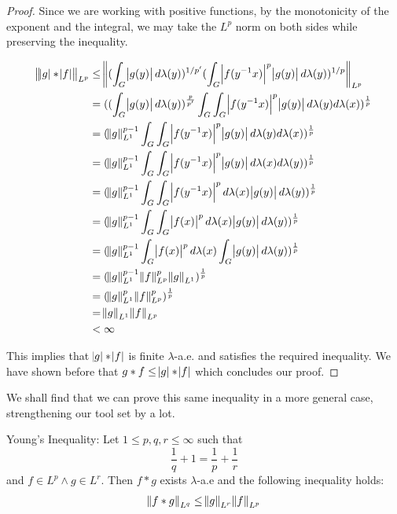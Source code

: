 \begin{proof}
Since we are working with positive functions, by the monotonicity of the exponent and the integral, we may take the $L^p$ norm on both sides while preserving the inequality.

\begin{align*}
\norm{\abs{g} \ast \abs{f}}_{L^p} &\leq
\norm{(\int_G \abs{g(y)} 
 d\lambda(y))^{1/p'}(\int_G \abs{f(y^{-1}x)}^p \abs{g(y)} d\lambda(y))^{1/p} }_{L^p} \\
&= ((\int_G \abs{g(y)} d\lambda(y))^\frac{p}{p'} \int_G \int_G \abs{f(y^{-1}x)}^p \abs{g(y)} d\lambda(y)d\lambda(x) )^\frac{1}{p} \\
&= (\norm{g}^{p-1}_{L^1} \int_G \int_G \abs{f(y^{-1}x)}^p \abs{g(y)} d\lambda(y)d\lambda(x) )^\frac{1}{p} \\
&= (\norm{g}^{p-1}_{L^1} \int_G \int_G \abs{f(y^{-1}x)}^p \abs{g(y)} d\lambda(x)d\lambda(y) )^\frac{1}{p} \\
&= (\norm{g}^{p-1}_{L^1} \int_G \int_G \abs{f(y^{-1}x)}^p  d\lambda(x) \abs{g(y)} d\lambda(y) )^\frac{1}{p} \\
&= (\norm{g}^{p-1}_{L^1} \int_G \int_G \abs{f(x)}^p  d\lambda(x) \abs{g(y)} d\lambda(y) )^\frac{1}{p} \\
&= (\norm{g}^{p-1}_{L^1} \int_G \abs{f(x)}^p  d\lambda(x) \int_G  \abs{g(y)} d\lambda(y) )^\frac{1}{p} \\
&= (\norm{g}^{p-1}_{L^1} \norm{f}^p_{L^p} \norm{g}_{L^1})^\frac{1}{p} \\
&= (\norm{g}^{p}_{L^1} \norm{f}^p_{L^p})^\frac{1}{p} \\
&= \norm{g}_{L^1} \norm{f}_{L^p}\\
&< \infty
\end{align*}

This implies that $\abs{g}\ast\abs{f}$ is finite $\lambda$-a.e. and satisfies the required inequality. We have shown before that $ g \ast f \leq \abs{g}\ast\abs{f}$ which concludes our proof.

\end{proof}

We shall find that we can prove this same inequality in a more general case, strengthening our tool set by a lot.

\begin{theorem}
Young's Inequality: Let $1 \leq p,q,r \leq \infty$ such that
\begin{equation*}
\frac{1}{q} + 1 = \frac{1}{p}+\frac{1}{r}
\end{equation*}
and $f \in L^p \wedge g\in L^r$. Then $f \ast g$ exists $\lambda$-a.e and the following inequality holds:
\begin{equation*}
\norm{f \ast g}_{L^q} \leq \norm{g}_{L^r}\norm{f}_{L^p}
\end{equation*}
\end{theorem}


